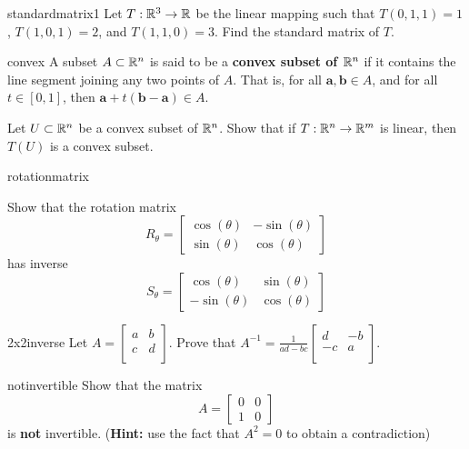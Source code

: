\begin{problem}{standardmatrix1}
    Let $T : \mathbb{R}^3 \to \mathbb{R}$ be the linear mapping such that $T(0,1,1) = 1$, $T(1,0,1) = 2$, and $T(1,1,0) = 3$.  Find the standard matrix of $T$.
\end{problem}

\begin{problem}{convex}
     A subset $A \subset \mathbb{R}^n$ is said to be a \textbf{convex subset of $\mathbb{R}^n$} if it contains the line segment joining any two points of $A$.  That is, for all $\bm{a}, \bm{b} \in A$, and for all $t \in [0,1]$, then $\bm{a} + t(\bm{b} -\bm{a}) \in A$.
     
     Let $U \subset \mathbb{R}^n$ be a convex subset of $\mathbb{R}^n$.  Show that if $T: \mathbb{R}^n \to \mathbb{R}^m$ is linear, then $T(U)$ is a convex subset.
\end{problem}


\begin{problem}{rotationmatrix}
    
    Show that the rotation matrix \begin{equation*}
R_\theta = 
\begin{bmatrix}
\cos(\theta) & -\sin(\theta) \\
\sin(\theta) & \cos(\theta)
\end{bmatrix}
\end{equation*}
has inverse \begin{equation*}
S_{\theta} = 
\begin{bmatrix}
\cos(\theta) & \sin(\theta) \\
-\sin(\theta) & \cos(\theta)
\end{bmatrix}
\end{equation*}
    
\end{problem}

\begin{problem}{2x2inverse}
    Let $A = 
\begin{bmatrix}
a & b \\
c & d \\
\end{bmatrix}$.  Prove that $A^{-1} = \frac{1}{ad-bc}\begin{bmatrix}
d & -b \\
-c & a \\
\end{bmatrix}$.
\end{problem}

\begin{problem}{notinvertible}
    Show that the matrix  \begin{equation*}
A = 
\begin{bmatrix}
0 & 0 \\
1 & 0
\end{bmatrix}
\end{equation*} is \textbf{not} invertible. (\textbf{Hint:} use the fact that $A^2 = 0$ to obtain a contradiction)
\end{problem}


